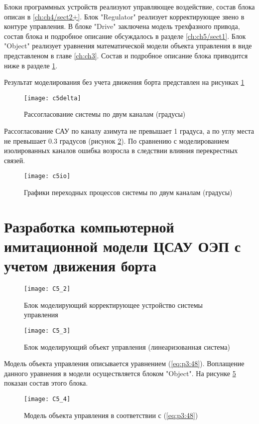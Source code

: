 Блоки программных устройств реализуют управляющее воздействие, состав блока описан в \ref{ch:ch4/sect2+}.
Блок "Regulator" реализует корректирующее звено в контуре управления.
В блоке "Drive" заключена модель трехфазного привода, состав блока и подробное описание обсуждалось в разделе \ref{ch:ch5/sect1}.
Блок "Object" реализует уравнения математической модели объекта управления в виде представленом в главе  \ref{ch:ch3}. Состав и подробное описание блока приводится ниже в разделе \ref{ch:ch5/sect3}.

Результат моделирования без учета движения борта представлен на рисунках \ref{fig:s5delta}

\begin{figure}[ht]
	\centering
	\texttt{[image: c5delta]} 
	\caption{Рассогласование системы по двум каналам (градусы)}
	\label{fig:s5delta}
\end{figure}

Рассогласование САУ по каналу азимута не превышает 1 градуса, а по углу места не превышает 0.3 градусов (рисунок \ref{fig:s5io}). По сравнению с моделированием изолированных каналов ошибка возросла в следствии влияния перекрестных связей.

\begin{figure}
	\centering
	\texttt{[image: c5io]} 
	\caption{Графики переходных процессов системы по двум каналам (градусы)}
	\label{fig:s5io}
\end{figure}



\section{Разработка компьютерной имитационной модели ЦСАУ ОЭП с учетом  движения борта} \label{ch:ch5/sect3}



\begin{figure}[ht]
	\centering
	\texttt{[image: C5\_2]} 
	\caption{Блок моделирующий корректирующее устройство системы управления}
	\label{fig:coorection}
\end{figure}

\begin{figure}[ht]
	\centering
	\texttt{[image: C5\_3]} 
	\caption{Блок моделирующий объект управления (линеаризованная система)}
	\label{fig:object_lin}
\end{figure}

 Модель объекта управления описывается уравнением (\ref{eq:p3:48}). Воплащение данного уравнения в модели осуществляется блоком "Object". На рисунке \ref{fig:object} показан состав этого блока.
\begin{figure}[ht]
	\centering
	\texttt{[image: C5\_4]} 
	\caption{Модель объекта управления в соответствии с (\ref{eq:p3:48})}
	\label{fig:object}
\end{figure}



